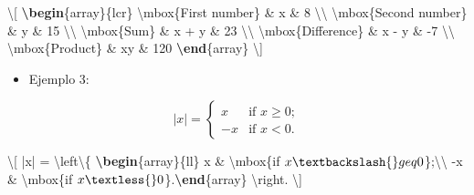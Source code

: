 \documentclass[12pt,a4paper,oneside,]{article}
\newenvironment{Shaded}{\begin{snugshade}}{\end{snugshade}}
\newcommand{\ExtensionTok}[1]{#1}
\newcommand{\KeywordTok}[1]{\textcolor[rgb]{0.13,0.29,0.53}{\textbf{#1}}}
\newcommand{\NormalTok}[1]{#1}
\newcommand{\SpecialCharTok}[1]{\textcolor[rgb]{0.00,0.00,0.00}{#1}}
\newcommand{\SpecialStringTok}[1]{\textcolor[rgb]{0.31,0.60,0.02}{#1}}
\providecommand{\tightlist}{%
  \setlength{\itemsep}{0pt}\setlength{\parskip}{0pt}}
\numberwithin{dummy}{section}
\theoremstyle{ocrenumbox}
\theoremstyle{blacknumex}
\theoremstyle{blacknumbox}
\theoremstyle{ocrenum}
\theoremstyle{ocrenum}
\begin{document}
\begin{Shaded}
\begin{Highlighting}[]
\SpecialStringTok{\textbackslash{}[ }
\KeywordTok{\textbackslash{}begin}\NormalTok{\{}\ExtensionTok{array}\NormalTok{\}}\SpecialStringTok{\{lcr\}}
\SpecialCharTok{\textbackslash{}mbox}\NormalTok{\{First number\}}\SpecialStringTok{ \& x \& 8 }\SpecialCharTok{\textbackslash{}\textbackslash{}}
\SpecialCharTok{\textbackslash{}mbox}\NormalTok{\{Second number\}}\SpecialStringTok{ \& y \& 15 }\SpecialCharTok{\textbackslash{}\textbackslash{}}
\SpecialCharTok{\textbackslash{}mbox}\NormalTok{\{Sum\}}\SpecialStringTok{ \& x + y \& 23 }\SpecialCharTok{\textbackslash{}\textbackslash{}}
\SpecialCharTok{\textbackslash{}mbox}\NormalTok{\{Difference\}}\SpecialStringTok{ \& x {-} y \& {-}7 }\SpecialCharTok{\textbackslash{}\textbackslash{}}
\SpecialCharTok{\textbackslash{}mbox}\NormalTok{\{Product\}}\SpecialStringTok{ \& xy \& 120 }\KeywordTok{\textbackslash{}end}\NormalTok{\{}\ExtensionTok{array}\NormalTok{\}}
\SpecialStringTok{\textbackslash{}]} 
\end{Highlighting}
\end{Shaded}

\begin{itemize}
\tightlist
\item
  Ejemplo 3:
\end{itemize}

\[ |x| = \left\{ \begin{array}{ll}
         x & \mbox{if $x \geq 0$};\\
        -x & \mbox{if $x < 0$}.\end{array} \right. \]

\begin{Shaded}
\begin{Highlighting}[]
\SpecialStringTok{\textbackslash{}[ |x| = }\SpecialCharTok{\textbackslash{}left\textbackslash{}\{}\SpecialStringTok{ }\KeywordTok{\textbackslash{}begin}\NormalTok{\{}\ExtensionTok{array}\NormalTok{\}}\SpecialStringTok{\{ll\}}
\SpecialStringTok{         x \& }\SpecialCharTok{\textbackslash{}mbox}\NormalTok{\{if }\SpecialStringTok{$x \textbackslash{}geq 0$}\NormalTok{\}}\SpecialStringTok{;}\SpecialCharTok{\textbackslash{}\textbackslash{}}
\SpecialStringTok{        {-}x \& }\SpecialCharTok{\textbackslash{}mbox}\NormalTok{\{if }\SpecialStringTok{$x \textless{} 0$}\NormalTok{\}}\SpecialStringTok{.}\KeywordTok{\textbackslash{}end}\NormalTok{\{}\ExtensionTok{array}\NormalTok{\}}\SpecialStringTok{ }\SpecialCharTok{\textbackslash{}right}\SpecialStringTok{. \textbackslash{}]} 
\end{Highlighting}
\end{Shaded}
\end{document}
